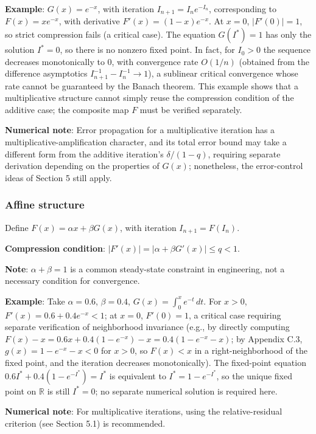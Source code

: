 \documentclass[11pt,a4paper]{amsart}
\begin{document}
\textbf{Example}: $G(x) = e^{-x}$, with iteration $I_{n+1} = I_n e^{-I_n}$, corresponding to $F(x) = x e^{-x}$, with derivative $F'(x) = (1-x)e^{-x}$. At $x = 0$, $|F'(0)| = 1$, so strict compression fails (a critical case). The equation $G(I^*) = 1$ has only the solution $I^* = 0$, so there is no nonzero fixed point. In fact, for $I_0 > 0$ the sequence decreases monotonically to $0$, with convergence rate $O(1/n)$ (obtained from the difference asymptotics $I_{n+1}^{-1} - I_n^{-1} \to 1$), a sublinear critical convergence whose rate cannot be guaranteed by the Banach theorem. This example shows that a multiplicative structure cannot simply reuse the compression condition of the additive case; the composite map $F$ must be verified separately.

\textbf{Numerical note}: Error propagation for a multiplicative iteration has a multiplicative-amplification character, and its total error bound may take a different form from the additive iteration's $\delta/(1-q)$, requiring separate derivation depending on the properties of $G(x)$; nonetheless, the error-control ideas of Section 5 still apply.

\subsubsection{Affine structure}

Define $F(x) = \alpha x + \beta G(x)$, with iteration $I_{n+1} = F(I_n)$.

\textbf{Compression condition}: $|F'(x)| = |\alpha + \beta G'(x)| \le q < 1$.

\textbf{Note}: $\alpha + \beta = 1$ is a common steady-state constraint in engineering, not a necessary condition for convergence.

\textbf{Example}: Take $\alpha = 0.6$, $\beta = 0.4$, $G(x) = \int_0^x e^{-t} \, dt$. For $x > 0$, $F'(x) = 0.6 + 0.4e^{-x} < 1$; at $x = 0$, $F'(0) = 1$, a critical case requiring separate verification of neighborhood invariance (e.g., by directly computing $F(x) - x = 0.6x + 0.4(1-e^{-x}) - x = 0.4(1-e^{-x}-x)$; by Appendix C.3, $g(x) = 1-e^{-x}-x < 0$ for $x > 0$, so $F(x) < x$ in a right-neighborhood of the fixed point, and the iteration decreases monotonically). The fixed-point equation $0.6I^* + 0.4(1 - e^{-I^*}) = I^*$ is equivalent to $I^* = 1 - e^{-I^*}$, so the unique fixed point on $\mathbb{R}$ is still $I^* = 0$; no separate numerical solution is required here.

\textbf{Numerical note}: For multiplicative iterations, using the relative-residual criterion (see Section 5.1) is recommended.
\end{document}
